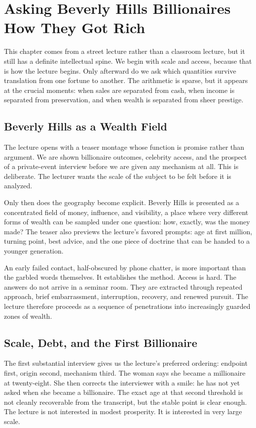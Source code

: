 \chapter{Asking Beverly Hills Billionaires How They Got Rich}

This chapter comes from a street lecture rather than a classroom lecture, but it still has a definite intellectual spine. We begin with scale and access, because that is how the lecture begins. Only afterward do we ask which quantities survive translation from one fortune to another. The arithmetic is sparse, but it appears at the crucial moments: when sales are separated from cash, when income is separated from preservation, and when wealth is separated from sheer prestige.

\section{Beverly Hills as a Wealth Field}

The lecture opens with a teaser montage whose function is promise rather than argument. We are shown billionaire outcomes, celebrity access, and the prospect of a private-event interview before we are given any mechanism at all. This is deliberate. The lecturer wants the scale of the subject to be felt before it is analyzed.

Only then does the geography become explicit. Beverly Hills is presented as a concentrated field of money, influence, and visibility, a place where very different forms of wealth can be sampled under one question: how, exactly, was the money made? The teaser also previews the lecture's favored prompts: age at first million, turning point, best advice, and the one piece of doctrine that can be handed to a younger generation.

An early failed contact, half-obscured by phone chatter, is more important than the garbled words themselves. It establishes the method. Access is hard. The answers do not arrive in a seminar room. They are extracted through repeated approach, brief embarrassment, interruption, recovery, and renewed pursuit. The lecture therefore proceeds as a sequence of penetrations into increasingly guarded zones of wealth.

\section{Scale, Debt, and the First Billionaire}

The first substantial interview gives us the lecture's preferred ordering: endpoint first, origin second, mechanism third. The woman says she became a millionaire at twenty-eight. She then corrects the interviewer with a smile: he has not yet asked when she became a billionaire. The exact age at that second threshold is not cleanly recoverable from the transcript, but the stable point is clear enough. The lecture is not interested in modest prosperity. It is interested in very large scale.

